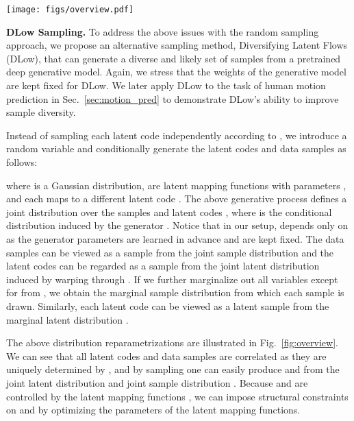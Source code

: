 \documentclass[runningheads]{llncs}
\begin{document}
	\begin{figure*}[t]
		\centering
		\texttt{[image: figs/overview.pdf]}
		\vspace{-7mm}
		\caption{\textbf{Overview of our DLow framework applied to diverse human motion prediction.} The network  takes past motion  as input and outputs the parameters of the mapping functions . Each mapping  transforms the random variable  to a different latent code  and also warps the density  to the latent code density . Each latent code  is decoded by the CVAE decoder into a motion sample .}
		\label{fig:overview}
		\vspace{-5mm}
	\end{figure*}
	
	\vspace{2mm}
	\noindent\textbf{DLow Sampling.} To address the above issues with the random sampling approach, we propose an alternative sampling method, Diversifying Latent Flows (DLow), that can generate a diverse and likely set of samples from a pretrained deep generative model. Again, we stress that the weights of the generative model are kept fixed for DLow. We later apply DLow to the task of human motion prediction in Sec.~\ref{sec:motion_pred} to demonstrate DLow's ability to improve sample diversity.
	
	Instead of sampling each latent code  independently according to , we introduce a random variable  and conditionally generate the latent codes  and data samples  as follows:
	
	where  is a Gaussian distribution,  are latent mapping functions with parameters , and each  maps  to a different latent code .
	The above generative process defines a joint distribution  over the samples  and latent codes , where  is the conditional distribution induced by the generator . Notice that in our setup,  depends only on  as the generator parameters  are learned in advance and are kept fixed. The data samples  can be viewed as a sample from the joint sample distribution  and the latent codes  can be regarded as a sample from the joint latent distribution  induced by warping  through . If we further marginalize out all variables except for  from , we obtain the marginal sample distribution  from which each sample  is drawn. Similarly, each latent code  can be viewed as a latent sample from the marginal latent distribution .
	
	The above distribution reparametrizations are illustrated in Fig.~\ref{fig:overview}. We can see that all latent codes  and data samples  are correlated as they are uniquely determined by , and by sampling  one can easily produce  and  from the joint latent distribution  and joint sample distribution . Because  and  are controlled by the latent mapping functions , we can impose structural constraints on  and  by optimizing the parameters  of the latent mapping functions.
	
\end{document}
